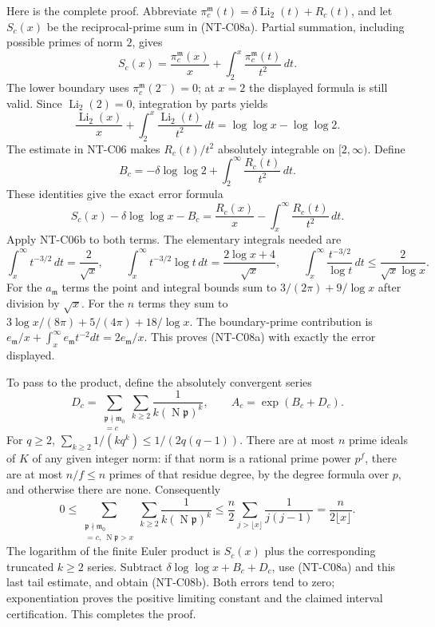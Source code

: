 Here is the complete proof.  Abbreviate
$\pi_c^{\mathfrak m}(t)=\delta\operatorname{Li}_2(t)+R_c(t)$,
and let $S_c(x)$ be the reciprocal-prime sum in (NT-C08a).
Partial summation, including possible primes of norm $2$, gives
\[
 S_c(x)=\frac{\pi_c^{\mathfrak m}(x)}x+
                  \int_2^x\frac{\pi_c^{\mathfrak m}(t)}{t^2}\,dt.
\]
The lower boundary uses $\pi_c^{\mathfrak m}(2^-)=0$;
at $x=2$ the displayed formula is still valid.
Since $\operatorname{Li}_2(2)=0$, integration by parts yields
\[
 \frac{\operatorname{Li}_2(x)}x+
          \int_2^x\frac{\operatorname{Li}_2(t)}{t^2}\,dt
               =\log\log x-\log\log2.
\]
The estimate in NT-C06 makes $R_c(t)/t^2$ absolutely integrable
on $[2,\infty)$.  Define
\[
 B_c=-\delta\log\log2+
                       \int_2^\infty\frac{R_c(t)}{t^2}\,dt.
\]
These identities give the exact error formula
\[
 S_c(x)-\delta\log\log x-B_c
          =\frac{R_c(x)}x-
                        \int_x^\infty\frac{R_c(t)}{t^2}\,dt.
\tag{NT-C08-tail}
\]
Apply NT-C06b to both terms.  The elementary integrals needed are
\[
 \int_x^\infty t^{-3/2}\,dt=\frac2{\sqrt x},\qquad
 \int_x^\infty t^{-3/2}\log t\,dt
                      =\frac{2\log x+4}{\sqrt x},\qquad
 \int_x^\infty\frac{t^{-3/2}}{\log t}\,dt
                      \le\frac2{\sqrt x\log x}.
\]
For the $a_{\mathfrak m}$ terms the point and integral bounds
sum to $3/(2\pi)+9/\log x$ after division by $\sqrt x$.
For the $n$ terms they sum to
$3\log x/(8\pi)+5/(4\pi)+18/\log x$.
The boundary-prime contribution is
$e_{\mathfrak m}/x+\int_x^\infty e_{\mathfrak m}t^{-2}dt
=2e_{\mathfrak m}/x$.  This proves (NT-C08a) with exactly
the error displayed.

To pass to the product, define the absolutely convergent series
\[
 D_c=\sum_{\substack{\mathfrak p\nmid\mathfrak m_0\\
                         [\mathfrak p]=c}}
                 \sum_{k\ge2}\frac1{k(\operatorname N\mathfrak p)^k},
 \qquad A_c=\exp(B_c+D_c).
\]
For $q\ge2$,
$\sum_{k\ge2}1/(kq^k)\le1/(2q(q-1))$.
There are at most $n$ prime ideals of $K$ of any given
integer norm: if that norm is a rational prime power $p^f$,
there are at most $n/f\le n$ primes of that residue degree,
by the degree formula over $p$, and otherwise there are none.
Consequently
\[
 0\le\sum_{\substack{\mathfrak p\nmid\mathfrak m_0\\
              [\mathfrak p]=c,\ \operatorname N\mathfrak p>x}}
            \sum_{k\ge2}\frac1{k(\operatorname N\mathfrak p)^k}
 \le\frac n2\sum_{j>\lfloor x\rfloor}\frac1{j(j-1)}
 =\frac{n}{2\lfloor x\rfloor}.
\]
The logarithm of the finite Euler product is $S_c(x)$ plus
the corresponding truncated $k\ge2$ series.  Subtract
$\delta\log\log x+B_c+D_c$, use (NT-C08a) and this last
tail estimate, and obtain (NT-C08b).  Both errors tend to zero;
exponentiation proves the positive limiting constant and the
claimed interval certification.  This completes the proof.

